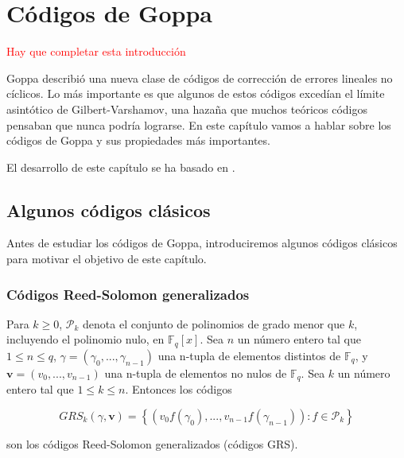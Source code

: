 
\chapter{Códigos de Goppa}

\textcolor{red}{Hay que completar esta introducción}

Goppa describió una nueva clase de códigos de corrección de errores lineales no cíclicos. Lo más importante es que algunos de estos códigos excedían el límite asintótico de Gilbert-Varshamov, una hazaña que muchos teóricos códigos pensaban que nunca podría lograrse. En este capítulo vamos a hablar sobre los códigos de Goppa y sus propiedades más importantes.


El desarrollo de este capítulo se ha basado en \cite{Goppa_codes_1973}.

\section{Algunos códigos clásicos}

Antes de estudiar los códigos de Goppa, introduciremos algunos códigos clásicos para motivar el objetivo de este capítulo.

\subsection{Códigos Reed-Solomon generalizados}

Para $k \geq 0$, $\mathcal{P}_k$ denota el conjunto de polinomios de grado menor que $k$, incluyendo el polinomio nulo, en $\mathbb{F}_q[x]$. Sea $n$ un número entero tal que $1 \leq n \leq q$, $\gamma = (\gamma _0,..., \gamma _{n-1})$ una n-tupla de elementos distintos de $\mathbb{F}_q$, y $\textbf{v} = (v_0,...,v_{n-1})$ una n-tupla de elementos no nulos de $\mathbb{F}_q$. Sea $k$ un número entero tal que $1 \leq k \leq n$. Entonces los códigos

$$GRS_k (\gamma, \textbf{v}) = \left\{ \left( v_0 f(\gamma_0), ..., v_{n-1}f(\gamma_{n-1}) \right) : f \in \mathcal{P}_k \right\}$$

son los códigos Reed-Solomon generalizados (códigos GRS).

